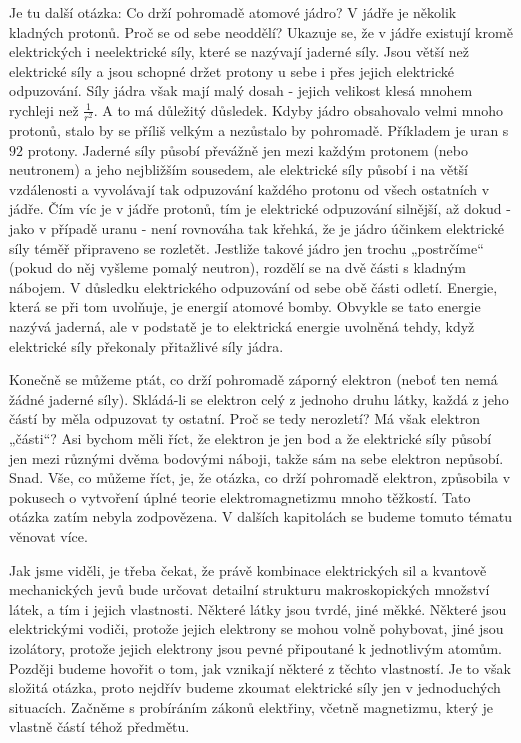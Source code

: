     Je tu další otázka: Co drží pohromadě atomové jádro? V jádře je několik kladných protonů. Proč 
    se od sebe neoddělí? Ukazuje se, že v jádře existují kromě elektrických i neelektrické síly, 
    které se nazývají jaderné síly. Jsou větší než elektrické síly a jsou schopné držet protony u 
    sebe i přes jejich elektrické odpuzování. Síly jádra však mají malý dosah - jejich velikost 
    klesá mnohem rychleji než \(\frac{1}{r^2}\). A to má důležitý důsledek. Kdyby jádro obsahovalo 
    velmi mnoho protonů, stalo by se příliš velkým a nezůstalo by pohromadě. Příkladem je uran s 
    \(92\) protony. Jaderné síly působí převážně jen mezi každým protonem (nebo neutronem) a jeho 
    nejbližším sousedem, ale elektrické síly působí i na větší vzdálenosti a vyvolávají tak 
    odpuzování každého protonu od všech ostatních v jádře. Čím víc je v jádře protonů, tím je 
    elektrické odpuzování silnější, až dokud - jako v případě uranu - není rovnováha tak křehká, že 
    je jádro účinkem elektrické síly téměř připraveno se rozletět. Jestliže takové jádro jen trochu 
    „postrčíme“ (pokud do něj vyšleme pomalý neutron), rozdělí se na dvě části s kladným nábojem. V 
    důsledku elektrického odpuzování od sebe obě části odletí. Energie, která se při tom 
    uvolňuje, je energií atomové bomby. Obvykle se tato energie nazývá jaderná, ale v podstatě je 
    to elektrická energie uvolněná tehdy, když elektrické síly překonaly přitažlivé síly jádra.
    
    Konečně se můžeme ptát, co drží pohromadě záporný elektron (neboť ten nemá žádné jaderné síly). 
    Skládá-li se elektron celý z jednoho druhu látky, každá z jeho částí by měla odpuzovat ty 
    ostatní. Proč se tedy nerozletí? Má však elektron „části“? Asi bychom měli říct, že elektron je 
    jen bod a že elektrické síly působí jen mezi různými dvěma bodovými náboji, takže sám na sebe 
    elektron nepůsobí. Snad. Vše, co můžeme říct, je, že otázka, co drží pohromadě elektron, 
    způsobila v pokusech o vytvoření úplné teorie elektromagnetizmu mnoho těžkostí. Tato otázka 
    zatím nebyla zodpovězena. V dalších kapitolách se budeme tomuto tématu věnovat více.
    
    Jak jsme viděli, je třeba čekat, že právě kombinace elektrických sil a kvantově mechanických 
    jevů bude určovat detailní strukturu makroskopických množství látek, a tím i jejich vlastnosti. 
    Některé látky jsou tvrdé, jiné měkké. Některé jsou elektrickými vodiči, protože jejich 
    elektrony se mohou volně pohybovat, jiné jsou izolátory, protože jejich elektrony jsou pevné 
    připoutané k jednotlivým atomům. Později budeme hovořit o tom, jak vznikají některé z těchto 
    vlastností. Je to však složitá otázka, proto nejdřív budeme zkoumat elektrické síly jen v 
    jednoduchých situacích. Začněme s probíráním zákonů elektřiny, včetně magnetizmu, který je 
    vlastně částí téhož předmětu.

